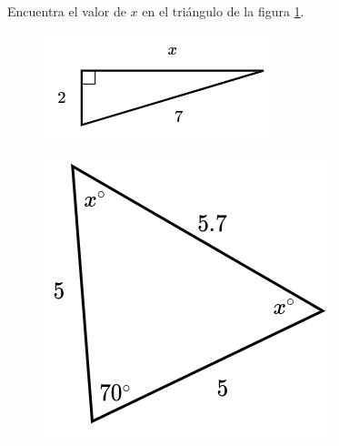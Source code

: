 Encuentra el valor de $x$ en el triángulo de la figura \ref{fig:lados_pitagoras_28}.

\begin{minipage}[t][][t]{0.35\textwidth}
    \begin{figure}[H]
        \centering
        \includegraphics[width=0.9\linewidth]{../images/lados_pitagoras_28.png}

        \caption{}
        \label{fig:lados_pitagoras_28}
    \end{figure}
\end{minipage}\hfill
\begin{minipage}[t][][t]{0.6\textwidth}
    \begin{solutionbox}{8cm}
        \begin{minipage}{0.3\textwidth}
            \begin{figure}[H]
                \centering
                \includegraphics[width=0.9\linewidth]{../images/findangle10a.png}
                \caption{}
                \label{fig:findangle10a}
            \end{figure}
        \end{minipage}\hfill
        \begin{minipage}{0.65\textwidth}

        \end{minipage}
    \end{solutionbox}
\end{minipage}
